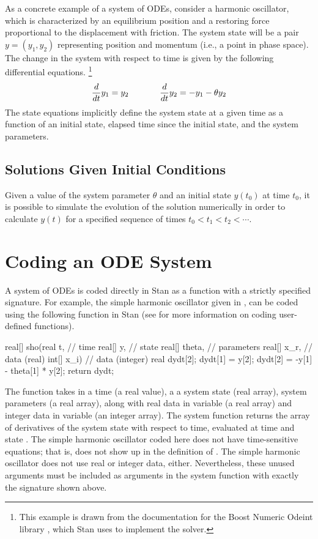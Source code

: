 As a concrete example of a system of ODEs, consider a harmonic
oscillator, which is characterized by an equilibrium position and a
restoring force proportional to the displacement with friction.  
The system state will be a pair $y = (y_1, y_2)$ representing position
and momentum (i.e., a point in phase space).  The change in the system
with respect to time is given by the following differential equations.%
%
\footnote{This example is drawn from the documentation for the Boost
  Numeric Odeint library \citep{AhnertMulansky:2011}, which Stan uses
  to implement the  solver.}
%
\begin{equation}\label{ode-sho.equation}
\frac{d}{dt} y_1 = y_2 
\hspace*{0.5in}
\frac{d}{dt} y_2 = -y_1 - \theta y_2
\end{equation}
%
The state equations implicitly define the system state at a given time
as a function of an initial state, elapsed time since the initial
state, and the system parameters.

\subsection{Solutions Given Initial Conditions}

Given a value of the system parameter $\theta$ and an initial state
$y(t_0)$ at time $t_0$, it is possible to simulate the evolution of
the solution numerically in order to calculate $y(t)$ for a specified
sequence of times $t_0 < t_1 < t_2 < \cdots$.

\section{Coding an ODE System}

A system of ODEs is coded directly in Stan as a function with a
strictly specified signature.  For example, the simple harmonic
oscillator given in , can be coded using the
following function in Stan (see  for
more information on coding user-defined functions).
%
\begin{stancode}
real[] sho(real t,        // time
           real[] y,      // state
           real[] theta,  // parameters
           real[] x_r,    // data (real)
           int[] x_i) {   // data (integer)
  real dydt[2];
  dydt[1] = y[2];
  dydt[2] = -y[1] - theta[1] * y[2];
  return dydt;
}
\end{stancode}
%
The function takes in a time  (a real value), a a system state
 (real array), system parameters  (a real array),
along with real data in variable  (a real array) and
integer data in variable  (an integer array).  The system
function returns the array of derivatives of the system state with
respect to time, evaluated at time  and state .  The
simple harmonic oscillator coded here does not have time-sensitive
equations; that is,  does not show up in the definition of
.  The simple harmonic oscillator does not use real or
integer data, either.  Nevertheless, these unused arguments must be
included as arguments in the system function with exactly the
signature shown above.


